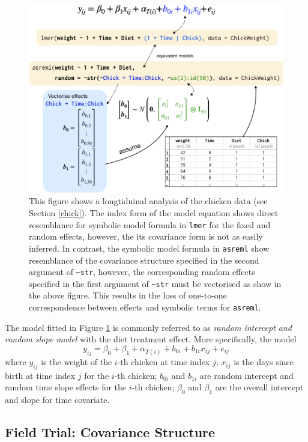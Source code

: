 \documentclass[runningheads]{llncs}
\begin{document}
\begin{figure}
\includegraphics[width=0.9\linewidth,fbox]{images/symbolic_lmm} \caption{This figure shows a longtiduinal analysis of the chicken data (see Section \ref{chick}). The index form of the model equation shows direct resemblance for symbolic model formula in \texttt{lmer} for the fixed and random effects, however, the its covariance form is not as easily inferred. In contrast, the symbolic model formula in \texttt{asreml} show resemblance of the covariance structure specified in the second argument of \texttt{\textasciitilde{}str}, however, the corresponding random effects specified in the first argument of \texttt{\textasciitilde{}str} must be vectorised as show in the above figure. This results in the loss of one-to-one correspondence between effects and symbolic terms for \texttt{asreml}.}\label{fig:symbolic-lmm}
\end{figure}



The model fitted in Figure \ref{fig:symbolic-lmm} is commonly referred to as \emph{random intercept and random slope model} with the diet treatment effect. More specifically, the model
\[y_{ij} = \beta_0 + \beta_1 + \alpha_{T(i)} + b_{0i} + b_{1i}x_{ij} + e_{ij}\]
where \(y_{ij}\) is the weight of the \(i\)-th chicken at time index \(j\); \(x_{ij}\) is the days since birth at time index \(j\) for the \(i\)-th chicken; \(b_{0i}\) and \(b_{1i}\) are random intercept and random time slope effects for the \(i\)-th chicken; \(\beta_0\) and \(\beta_1\) are the overall intercept and slope for time covariate.

\hypertarget{atrial}{%
\subsection{Field Trial: Covariance Structure}\label{atrial}}
\end{document}
